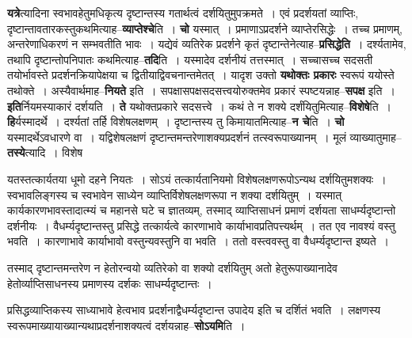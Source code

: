 \documentclass[article,12pt,a4paper]{memoir}
\begin{document}
	  \pstart \textbf{यत्रे}त्यादिना स्वभावहेतुमधिकृत्य दृष्टान्तस्य गतार्थत्वं दर्शयितुमुपक्रमते । एवं प्रदर्शयतां व्याप्तिः, दृष्टान्तावतारकस्तुकथमित्याह--\textbf{व्याप्तेश्चे}ति । \textbf{चो} यस्मात् । प्रमाणाऽप्रदर्शने व्याप्तेरसिद्धेः । तच्च प्रमाणम्, अन्तरेणाधिकरणं न सम्भवतीति भावः । यद्येवं व्यतिरेक \leavevmode{} प्रदर्शने कृतं दृष्टान्तेनेत्याह--\textbf{प्रसिद्धेति} । दर्श्यतामेव, तथापि दृष्टान्तोपनिपातः कथमित्याह--\textbf{तदि}ति । यस्मादेव दर्शनीयं तत्तस्मात् । सच्चासच्च सदसती तयोर्भावस्ते प्रदर्शनक्रियापेक्षया च द्वितीयाद्विवचनान्तमेतत् । यादृश उक्तो \textbf{यथोक्तः प्रकारः} स्वरूपं ययोस्ते तथोक्ते । अस्यैवार्थमाह--\textbf{नियते} इति । सपक्षासपक्षसदसत्त्वयोरुक्तमेव प्रकारं स्पष्टयन्नाह--\textbf{सपक्ष} इति । \textbf{इति}र्नियमस्याकारं दर्शयति । \textbf{ते} यथोक्तप्रकारे सदसत्त्वे । कथं ते न शक्ये दर्शंयितुमित्याह--\textbf{विशेषे}ति । \textbf{हि}र्यस्मादर्थे । दर्श्यतां तर्हि विशेषलक्षणम् । दृष्टान्तस्य तु किमायातमित्याह--\textbf{न चे}ति । \textbf{चो} यस्मादर्थेऽवधारणे वा । यद्विशेषलक्षणं दृष्टान्तमन्तरेणाशक्यप्रदर्शनं तत्स्वरूपाख्यानम् । मूलं व्याख्यातुमाह--\textbf{तस्ये}त्यादि । विशेष  \leavevmode{} 
	  
	यतस्तत्कार्यतया धूमो दहने नियतः । सोऽयं तत्कार्यतानियमो विशेषलक्षणरूपोऽन्यथ दर्शयितुमशक्यः । स्वभावलिङ्गस्य च स्वभावेन साध्येन व्याप्तिर्विशेषलक्षणरूपा न शक्या दर्शयितुम् । यस्मात् कार्यकारणभावस्तादात्म्यं च महानसे घटे च ज्ञातव्यम्, तस्माद् व्याप्तिसाधनं प्रमाणं दर्शयता साधर्म्यदृष्टान्तो दर्शनीयः । वैधर्म्यदृष्टान्तस्तु प्रसिद्धे तत्कार्यत्वे कारणाभावे कार्याभावप्रतिपत्त्यर्थम् । तत एव नावश्यं वस्तु भवति । कारणाभावे कार्याभावो वस्तुन्यवस्तुनि वा भवति । ततो वस्त्ववस्तु वा वैधर्म्यदृष्टान्त इष्यते ।  
	  
	तस्माद् दृष्टान्तमन्तरेण न हेतोरन्वयो व्यतिरेको वा शक्यो दर्शयितुम् अतो हेतुरूपाख्यानादेव हेतोर्व्याप्तिसाधनस्य प्रमाणस्य दर्शकः साधर्म्यदृष्टान्तः ।  
	  
	प्रसिद्धव्याप्तिकस्य साध्याभावे हेत्वभाव प्रदर्शनाद्वैधर्म्यदृष्टान्त उपादेय इति च दर्शितं भवति । लक्षणस्य स्वरूपमाख्यायाख्यान्यथाप्रदर्शनाशक्यत्वं दर्शयन्नाह--\textbf{सोऽयमि}ति ।
	\pend
      
\end{document}
